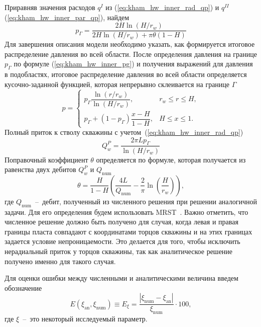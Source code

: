 \documentclass{article}
\begin{document}
Приравняв значения расходов $q^I$ из (\ref{eq:kham_hw_inner_rad_qp})
и $q^{II}$ (\ref{eq:kham_hw_inner_par_qp}), найдем
\begin{equation}
	\displaystyle
	p_{\Gamma} = \dfrac{2 H \ln{\left(H/r_w\right)}}{2 H \ln{\left(H/r_w\right)
			+ \pi \theta \left(1 - H\right)}}
	\label{eq:kham_hw_inner_pg}
\end{equation}
Для завершения описания модели необходимо указать, как формируется итоговое
распределение давления во всей области. После определения давления на
границе $p_{\Gamma}$ по формуле (\ref{eq:kham_hw_inner_pg}) и получения
выражений для давления в подобластях, итоговое распределение давления во всей
области определяется кусочно-заданной функцией, которая непрерывно склеивается
на границе
$\Gamma$
\begin{equation}
	p =
	\begin{cases}
		p_{\Gamma} \dfrac{\ln{\left(r/r_w\right)}}{\ln{\left(H/r_w\right)}}, & r_w \leq r \leq H, \\
		p_{\Gamma} + (1 - p_{\Gamma})\dfrac{x - H}{1-H},                     & H \leq x \leq 1.
	\end{cases}
	\label{eq:kham_hw_inner_total_pressure}
\end{equation}
Полный приток к стволу скважины с учетом~(\ref{eq:kham_hw_inner_rad_qp})
\begin{equation}
	\displaystyle
	Q_w^P = \dfrac{2\pi L p_{\Gamma}}{\ln{\left(H/r_w\right)}}
	\label{eq:kham_hw_inner_Q}
\end{equation}
Поправочный коэффициент $\theta$ определяется по формуле, которая получается
из равенства двух дебитов $Q_w^P$ и $Q_{\text{num}}$
\begin{equation}
	\displaystyle
	\theta = \dfrac{H}{1-H} \left(\dfrac{4L}{Q_{\text{num}}}
	- \dfrac{2}{\pi} \ln \left(\dfrac{H}{r_w}\right)\right),
	\label{eq:kham_hw_inner_theta}
\end{equation}
где $Q_{\text{num}}$~--~дебит, полученный из численного решения при решении
аналогичной задачи. Для его определения будем использовать MRST~\cite{lit:kham_mrst}.
Важно отметить, что численное решение должно быть получено для случая, когда левая
и правая границы пласта совпадают с координатами торцов скважины и на этих границах
задается условие непроницаемости. Это делается для того, чтобы исключить
нерадиальный приток у торцов скважины, так как аналитическое решение получено
именно для такого случая.

Для оценки ошибки между численными и аналитическими величина введем обозначение
\begin{equation}
	\displaystyle
	E \left(\xi_{\text{an}}, \xi_{\text{num}}\right) \equiv E_{\xi} =
	\dfrac{ \left| \xi_{\text{num}} - \xi_{\text{an}} \right| }{\xi_{\text{num}}} \cdot 100,
	\label{eq:kham_common_residual}
\end{equation}
где $\xi$~--~это некоторый исследуемый параметр.
\end{document}
